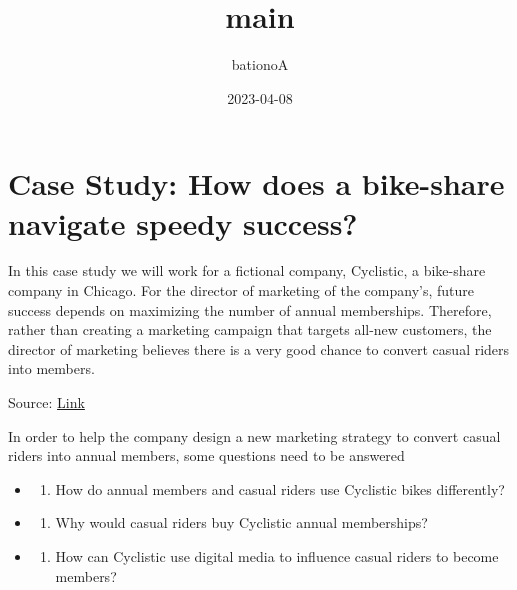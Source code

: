 \documentclass[
]{article}
\title{main}
\author{bationoA}
\date{2023-04-08}
\providecommand{\tightlist}{%
  \setlength{\itemsep}{0pt}\setlength{\parskip}{0pt}}
\begin{document}
\maketitle

\hypertarget{case-study-how-does-a-bike-share-navigate-speedy-success}{%
\section{Case Study: How does a bike-share navigate speedy
success?}\label{case-study-how-does-a-bike-share-navigate-speedy-success}}

In this case study we will work for a fictional company, Cyclistic, a
bike-share company in Chicago. For the director of marketing of the
company's, future success depends on maximizing the number of annual
memberships. Therefore, rather than creating a marketing campaign that
targets all-new customers, the director of marketing believes there is a
very good chance to convert casual riders into members.

Source:
\href{https://d3c33hcgiwev3.cloudfront.net/aacF81H_TsWnBfNR_x7FIg_36299b28fa0c4a5aba836111daad12f1_DAC8-Case-Study-1.pdf?Expires=1681084800\&Signature=WgKO~-LpPUMKTGb95H3tFbjTpbRvtu1nqBpjLACnTFrK6jBlggPYFa4lDd6jERYrYmrs7kP~4W~AJU4a3TgXhrp8XFq2c5L5gXwSIcBZNrDDKEeT1ZPXQzSUUGbFtvzy5iz-TyEvMJ-2ETjsA-oDex859GY-Ztjr8EitozVmK2w_\&Key-Pair-Id=APKAJLTNE6QMUY6HBC5A}{Link}

In order to help the company design a new marketing strategy to convert
casual riders into annual members, some questions need to be answered

\begin{itemize}
\item
  \begin{enumerate}
  \def\labelenumi{\arabic{enumi}.}
  \tightlist
  \item
    How do annual members and casual riders use Cyclistic bikes
    differently?
  \end{enumerate}
\item
  \begin{enumerate}
  \def\labelenumi{\arabic{enumi}.}
  \setcounter{enumi}{1}
  \tightlist
  \item
    Why would casual riders buy Cyclistic annual memberships?
  \end{enumerate}
\item
  \begin{enumerate}
  \def\labelenumi{\arabic{enumi}.}
  \setcounter{enumi}{2}
  \tightlist
  \item
    How can Cyclistic use digital media to influence casual riders to
    become members?
  \end{enumerate}
\end{itemize}
\end{document}
